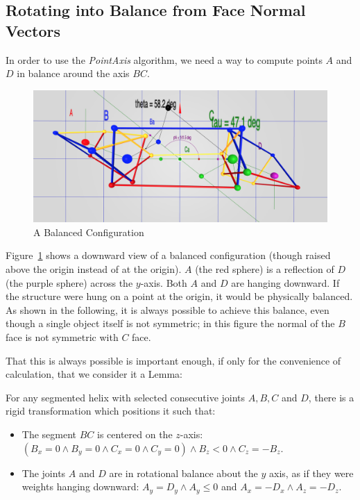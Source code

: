 \documentclass[mathematics,article,submit,pdftex,moreauthors]{Definitions/mdpi}
\begin{document}
\subsection{Rotating into Balance from Face Normal Vectors}

\label{sec:balance}



In order to use the {\em PointAxis} algorithm, we need a way
to compute points $A$ and $D$ in balance around the axis $BC$.

\begin{figure}
  \centering
  \captionsetup{justification=centering}
     \includegraphics[width=10 cm]{figures/Balance.png}
     \caption{A Balanced Configuration}
  \label{fig:balancediagram}
\end{figure}
\unskip



Figure~\ref{fig:balancediagram} shows a downward view of a
balanced configuration (though raised above the origin
instead of at the origin).
$A$ (the red sphere) is a reflection of $D$ (the purple sphere) across
the $y$-axis.
Both $A$ and $D$ are hanging downward.
If the structure were hung on a point at the origin, it would
be physically balanced.
As shown in the following, it is always possible to achieve this balance,
even though a single object
itself is not symmetric; in this figure the normal of the $B$ face is not symmetric with $C$ face.

That this is always possible is important enough, if only for
the convenience of calculation, that we consider it a Lemma:
\begin{Lemma}
  For any segmented helix with selected consecutive joints $A,B,C$ and $D$,
  there is a rigid transformation which positions it such that:
  \begin{itemize}
  \item The segment $BC$ is centered on the $z$-axis:
    $(B_x = 0 \wedge B_y = 0 \wedge C_x = 0 \wedge C_y = 0)
    \wedge B_z < 0 \wedge C_z = -B_z$.
  \item The joints $A$ and $D$ are in rotational balance about
    the $y$ axis, as if they were weights hanging downward:
    $A_y = D_y \wedge A_y \leq 0 $ and
    $A_x = -D_x \wedge A_z = -D_z$.
  \end{itemize}
  \label{lem:balance}
\end{Lemma}
\end{document}
